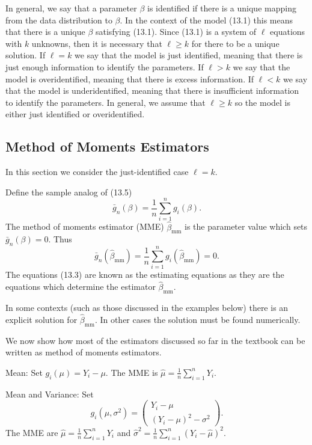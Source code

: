 \documentclass[10pt]{article}
\begin{document}
In general, we say that a parameter $\beta$ is identified if there is a unique mapping from the data distribution to $\beta$. In the context of the model (13.1) this means that there is a unique $\beta$ satisfying (13.1). Since (13.1) is a system of $\ell$ equations with $k$ unknowns, then it is necessary that $\ell \geq k$ for there to be a unique solution. If $\ell=k$ we say that the model is just identified, meaning that there is just enough information to identify the parameters. If $\ell>k$ we say that the model is overidentified, meaning that there is excess information. If $\ell<k$ we say that the model is underidentified, meaning that there is insufficient information to identify the parameters. In general, we assume that $\ell \geq k$ so the model is either just identified or overidentified.

\subsection{Method of Moments Estimators}
In this section we consider the just-identified case $\ell=k$.

Define the sample analog of (13.5)
$$
\bar{g}_{n}(\beta)=\frac{1}{n} \sum_{i=1}^{n} g_{i}(\beta) .
$$
The method of moments estimator (MME) $\widehat{\beta}_{\mathrm{mm}}$ is the parameter value which sets $\bar{g}_{n}(\beta)=0$. Thus
$$
\bar{g}_{n}\left(\widehat{\beta}_{\mathrm{mm}}\right)=\frac{1}{n} \sum_{i=1}^{n} g_{i}\left(\widehat{\beta}_{\mathrm{mm}}\right)=0 .
$$
The equations (13.3) are known as the estimating equations as they are the equations which determine the estimator $\widehat{\beta}_{\mathrm{mm}}$.

In some contexts (such as those discussed in the examples below) there is an explicit solution for $\widehat{\beta}_{\mathrm{mm}}$. In other cases the solution must be found numerically.

We now show how most of the estimators discussed so far in the textbook can be written as method of moments estimators.

Mean: Set $g_{i}(\mu)=Y_{i}-\mu$. The MME is $\widehat{\mu}=\frac{1}{n} \sum_{i=1}^{n} Y_{i}$.

Mean and Variance: Set
$$
g_{i}\left(\mu, \sigma^{2}\right)=\left(\begin{array}{c}
Y_{i}-\mu \\
\left(Y_{i}-\mu\right)^{2}-\sigma^{2}
\end{array}\right) .
$$
The MME are $\widehat{\mu}=\frac{1}{n} \sum_{i=1}^{n} Y_{i}$ and $\widehat{\sigma}^{2}=\frac{1}{n} \sum_{i=1}^{n}\left(Y_{i}-\widehat{\mu}\right)^{2}$.
\end{document}
